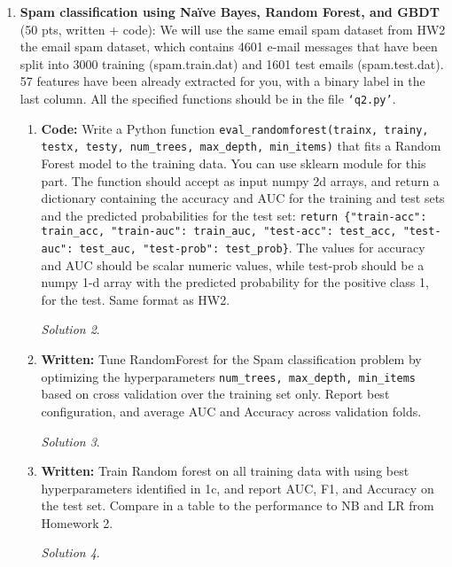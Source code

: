\documentclass[a4paper,12pt]{article}
\theoremstyle{definition}
\theoremstyle{remark}
\newtheorem*{solution}{Solution}
\begin{document}
\begin{enumerate}
\begin{enumerate}
\begin{solution}
			\end{solution}
			\item {\bf Written:} visualize top 3 levels in your decision tree in 1h and 1i. Compare the top-level features used by your
			tree, with the features selected in 1d. Comment on overlap/order of importance of features in the two methods.
		\end{enumerate}
		\item {\bf Spam classification using Naïve Bayes, Random Forest, and GBDT} (50  pts, written + code):
		We will use the same email spam dataset from HW2 the email spam dataset, which contains 4601 e-mail messages
		that have been split into 3000 training (spam.train.dat) and 1601 test emails (spam.test.dat). 57 features have been
		already extracted for you, with a binary label in the last column.
		All the specified functions should be in the file \texttt{‘q2.py’}.
		\begin{enumerate}
			\item {\bf Code:} Write a Python function {\tt eval\_randomforest(trainx, trainy, testx, testy, num\_trees, max\_depth, min\_items)} that fits a Random Forest model to the training data. You can use sklearn module for this part. The
			function should accept as input numpy 2d arrays, and return a dictionary containing the accuracy and AUC for the
			training and test sets and the predicted probabilities for the test set: {\tt return \{"train-acc": train\_acc, "train-auc":
				train\_auc, "test-acc": test\_acc, "test-auc": test\_auc, "test-prob": test\_prob\}}. The values for accuracy and AUC should be scalar numeric values, while test-prob should be a numpy 1-d array with the predicted probability for the positive class 1, for the test. Same format as HW2.
			\begin{solution}
			\end{solution}
			\item  {\bf Written:} Tune RandomForest for the Spam classification problem by optimizing the hyperparameters
			{\tt num\_trees, max\_depth, min\_items} based on cross validation over the training set only. Report best configuration,
			and average AUC and Accuracy across validation folds.
			\begin{solution}
			\end{solution}
			\item {\bf Written:} Train Random forest on all training data with using best hyperparameters identified in 1c, and report
			AUC, F1, and Accuracy on the test set. Compare in a table to the performance to NB and LR from Homework 2.
			\begin{solution}
				

\end{solution}
\end{enumerate}
\end{enumerate}
\end{document}
